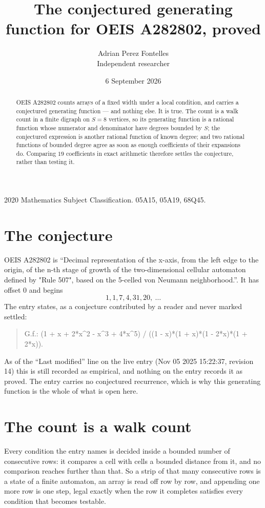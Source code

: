 \documentclass[11pt,a4paper]{article}
\title{The conjectured generating function for OEIS A282802, proved}
\author{Adrian Perez Fontelles\\ \small Independent researcher}
\date{6 September 2026}
\theoremstyle{plain}
\theoremstyle{definition}
\begin{document}
\maketitle

\begin{abstract}
OEIS A282802 counts arrays of a fixed width under a local condition, and carries a conjectured
generating function --- and nothing else. It is true. The count is a walk count in a finite
digraph on $S=8$ vertices, so its generating function is a rational function whose numerator
and denominator have degrees bounded by $S$; the conjectured expression is another rational
function of known degree; and two rational functions of bounded degree agree as soon as enough
coefficients of their expansions do. Comparing $19$ coefficients in exact arithmetic
therefore settles the conjecture, rather than testing it.
\end{abstract}

\noindent\small 2020 Mathematics Subject Classification. 05A15, 05A19, 68Q45.\normalsize

\section{The conjecture}

OEIS A282802 is ``Decimal representation of the x-axis, from the left edge to the origin, of the n-th stage of growth of the two-dimensional cellular automaton defined by "Rule 507", based on the 5-celled von Neumann neighborhood.''. It has offset $0$ and begins
\[
1, 1, 7, 4, 31, 20,\ \dots
\]
The entry states, as a conjecture contributed by a reader and never marked settled:
\begin{quote}
G.f.: (1 + x + 2*x\^{}2 - x\^{}3 + 4*x\^{}5) / ((1 - x)*(1 + x)*(1 - 2*x)*(1 + 2*x)).
\end{quote}
As of the ``Last modified'' line on the live entry (Nov 05 2025 15:22:37, revision 14) this is still
recorded as empirical, and nothing on the entry records it as proved. The entry carries no
conjectured recurrence, which is why this generating function is the whole of what is open
here.

\section{The count is a walk count}

Every condition the entry names is decided inside a bounded number of consecutive rows: it
compares a cell with cells a bounded distance from it, and no comparison reaches further than
that. So a strip of that many consecutive rows is a state of a finite automaton, an array is
read off row by row, and appending one more row is one step, legal exactly when the row it
completes satisfies every condition that becomes testable.
\end{document}
